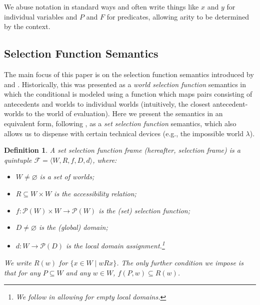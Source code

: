 \documentclass[12pt]{article}
\newtheorem{definition}{Definition}
\newcommand{\tup}[1]{\langle #1 \rangle}
\begin{document}
We abuse notation in standard ways and often write things like $x$ and $y$ for individual variables and $P$ and $F$ for predicates, allowing arity to be determined by the context. 


\subsection{Selection Function Semantics}
\label{Subsection:Set Selection Function Semantics}

The main focus of this paper is on the selection function semantics introduced by \cite{Stalnaker1968theory} and \cite{StalnakerThomason1970}. 
Historically, this was presented as a \textit{world selection function} semantics in which the conditional is modeled using a function which maps pairs consisting of antecedents and worlds to individual worlds (intuitively, the closest antecedent-worlds to the world of evaluation). 
Here we present the semantics in an equivalent form, following \cite[\S2.7]{Lewis1973}, as a \textit{set selection function} semantics, which also allows us to dispense with certain technical devices (e.g., the impossible world $\lambda$).

\begin{definition}
\label{Definition:Set Selection Frame}
    A \emph{set selection function frame} (hereafter, \emph{selection frame}) is a quintuple $\mathcal{F} = \tup{W,R,f,D,d}$, where:
    \begin{itemize}
        \item $W \neq \varnothing$ is a set of worlds;
        \item $R \subseteq W \times W$ is the accessibility relation; 
        \item $f:\mathcal{P}(W)\times W \to \mathcal{P}(W)$ is the (set) selection function;
        \item $D \neq \varnothing$ is the (global) domain;
        \item $d\colon W \rightarrow \mathcal{P}(D)$ is the local domain assignment.\footnote{We follow \cite[p.~25]{StalnakerThomason1970} in allowing for empty local domains.}
    \end{itemize}
    We write $R(w)$ for $\{x \in W \mid wRx\}$. The only further condition we impose is that for any $P \subseteq W$ and any $w\in W$, $f(P,w) \subseteq R(w)$.
\end{definition}
\end{document}

